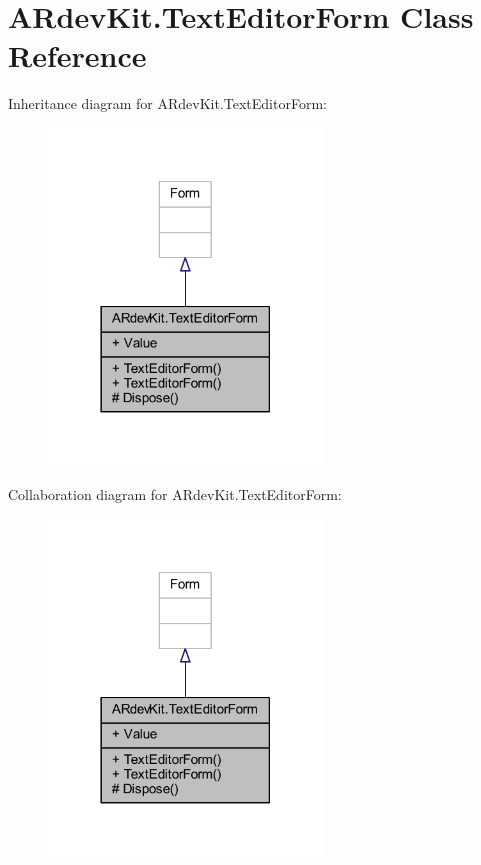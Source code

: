 \hypertarget{class_a_rdev_kit_1_1_text_editor_form}{\section{A\-Rdev\-Kit.\-Text\-Editor\-Form Class Reference}
\label{class_a_rdev_kit_1_1_text_editor_form}
}


Inheritance diagram for A\-Rdev\-Kit.\-Text\-Editor\-Form\-:
\nopagebreak
\begin{figure}[H]
\begin{center}
\leavevmode
\includegraphics[width=206pt]{class_a_rdev_kit_1_1_text_editor_form__inherit__graph}
\end{center}
\end{figure}


Collaboration diagram for A\-Rdev\-Kit.\-Text\-Editor\-Form\-:
\nopagebreak
\begin{figure}[H]
\begin{center}
\leavevmode
\includegraphics[width=206pt]{class_a_rdev_kit_1_1_text_editor_form__coll__graph}
\end{center}
\end{figure}
